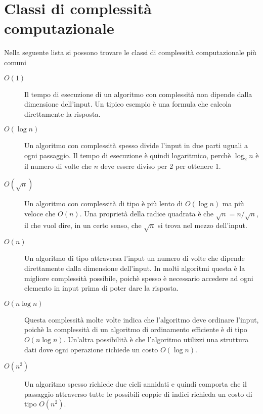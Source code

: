 \section{Classi di complessità computazionale}


Nella seguente lista si possono trovare le classi di
complessità computazionale più comuni

\begin{description}
\item[$O(1)$]
Il tempo di esecuzione di un algoritmo con complessità 
non dipende dalla dimensione dell'input.
Un tipico esempio è una formula che calcola
direttamente la risposta.

\item[$O(\log n)$]
Un algoritmo con complessità  spesso divide
l'input in due parti uguali a ogni passaggio.
Il tempo di esecuzione è quindi logaritmico, perchè 
$\log_2 n$ è il numero di volte che $n$ deve
essere diviso per 2 per ottenere 1.

\item[$O(\sqrt n)$]
Un algoritmo con complessità di tipo  è più lento di 
$O(\log n)$ ma più veloce che $O(n)$.
Una proprietà della radice quadrata è che
$\sqrt n = n/\sqrt n$, il che vuol dire, in un certo senso,
che $\sqrt n$ si trova nel mezzo dell'input.

\item[$O(n)$]
Un algoritmo di tipo  attraversa l'input 
un numero di volte che dipende direttamente dalla dimensione dell'input.
In molti algoritmi questa è la migliore complessità possibile,
poichè spesso è necessario accedere ad ogni elemento in input 
prima di poter dare la risposta.

\item[$O(n \log n)$]
Questa complessità molte volte indica che l'algoritmo
deve ordinare l'input,
poichè la complessità di un algoritmo di ordinamento efficiente è di tipo
$O(n \log n)$.
Un'altra possibilità è che l'algoritmo utilizzi una struttura dati
dove ogni operazione richiede un costo $O(\log n)$.

\item[$O(n^2)$]
Un algoritmo  spesso richiede 
due cicli annidati e quindi comporta che 
il passaggio attraverso tutte le possibili coppie di 
indici richieda un costo di tipo $O(n^2)$.


\end{description}
